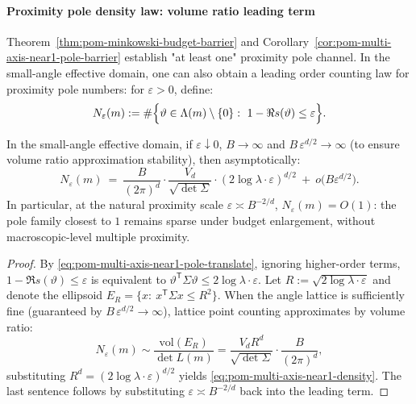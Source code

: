 \paragraph{Proximity pole density law: volume ratio leading term}
Theorem~\ref{thm:pom-minkowski-budget-barrier} and Corollary~\ref{cor:pom-multi-axis-near1-pole-barrier} establish "at least one" proximity pole channel.
In the small-angle effective domain, one can also obtain a leading order counting law for proximity pole numbers: for $\varepsilon>0$, define:
\[
N_\varepsilon(m):=\#\Bigl\{\vartheta\in \Lambda(m)\setminus\{0\}:\ 1-\Re s(\vartheta)\le \varepsilon\Bigr\}.
\]

\begin{proposition}\label{prop:pom-multi-axis-near1-density}
In the small-angle effective domain, if $\varepsilon\downarrow 0$, $B\to\infty$ and $B\,\varepsilon^{d/2}\to\infty$ (to ensure volume ratio approximation stability), then asymptotically:
\begin{equation}\label{eq:pom-multi-axis-near1-density}
N_{\varepsilon}(m)
\ =\
\frac{B}{(2\pi)^{d}}\cdot\frac{V_{d}}{\sqrt{\det\Sigma}}\cdot(2\log\lambda\cdot\varepsilon)^{d/2}
\ +\ o\!\bigl(B\varepsilon^{d/2}\bigr).
\end{equation}
In particular, at the natural proximity scale $\varepsilon\asymp B^{-2/d}$, $N_\varepsilon(m)=O(1)$: the pole family closest to $1$ remains sparse under budget enlargement, without macroscopic-level multiple proximity.
\end{proposition}

\begin{proof}
By \eqref{eq:pom-multi-axis-near1-pole-translate}, ignoring higher-order terms,
\(
1-\Re s(\vartheta)\le \varepsilon
\)
is equivalent to
\(
\vartheta^{\mathsf T}\Sigma\vartheta\le 2\log\lambda\cdot\varepsilon
\).
Let $R:=\sqrt{2\log\lambda\cdot\varepsilon}$ and denote the ellipsoid $E_R=\{x:\ x^{\mathsf T}\Sigma x\le R^2\}$.
When the angle lattice is sufficiently fine (guaranteed by $B\,\varepsilon^{d/2}\to\infty$), lattice point counting approximates by volume ratio:
\[
N_\varepsilon(m)
\sim
\frac{\mathrm{vol}(E_R)}{\det L(m)}
=\frac{V_d R^d}{\sqrt{\det\Sigma}}\cdot\frac{B}{(2\pi)^d},
\]
substituting $R^d=(2\log\lambda\cdot\varepsilon)^{d/2}$ yields \eqref{eq:pom-multi-axis-near1-density}.
The last sentence follows by substituting $\varepsilon\asymp B^{-2/d}$ back into the leading term.
\end{proof}


